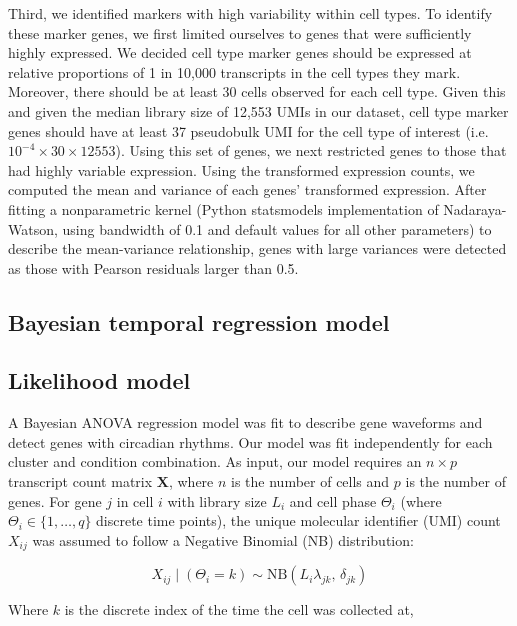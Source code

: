 \documentclass[12pt]{article}
\begin{document}
Third, we identified markers with high variability within cell types. To identify these marker
genes, we first limited ourselves to genes that were sufficiently highly expressed. We decided cell
type marker genes should be expressed at relative proportions of 1 in 10,000 transcripts in the cell
types they mark. Moreover, there should be at least 30 cells observed for each cell type. Given this
and given the median library size of 12,553 UMIs in our dataset, cell type marker genes should have
at least 37 pseudobulk UMI for the cell type of interest (i.e.\ $10^{-4} \times 30 \times 12553$).
Using this set of genes, we next restricted genes to those that had highly variable expression.
Using the transformed expression counts, we computed the mean and variance of each genes'
transformed expression. After fitting a nonparametric kernel (Python statsmodels implementation of
Nadaraya-Watson, using bandwidth of 0.1 and default values for all other parameters) to describe the
mean-variance relationship, genes with large variances were detected as those with Pearson residuals
larger than 0.5.

\subsection*{Bayesian temporal regression model}

\subsection*{Likelihood model}

A Bayesian ANOVA regression model was fit to describe gene waveforms and detect genes with circadian
rhythms. Our model was fit independently for each cluster and condition combination. As input, our
model requires an $n \times p$ transcript count matrix $\mathbf{X}$, where $n$ is the number of
cells and $p$ is the number of genes. For gene $j$ in cell $i$ with library size $L_{i}$ and cell
phase $\Theta_{i}$ (where $\Theta_{i} \in \{1,\ldots,q\}$ discrete time points), the unique
molecular identifier (UMI) count $X_{ij}$ was assumed to follow a Negative Binomial (NB)
distribution:

\begin{equation}
X_{ij} \mid (\Theta_{i} = k) \sim \mathrm{NB}\!\left( L_{i}\lambda_{jk},\,\delta_{jk} \right)
\end{equation}

Where $k$ is the discrete index of the time the cell was collected at,
\end{document}
